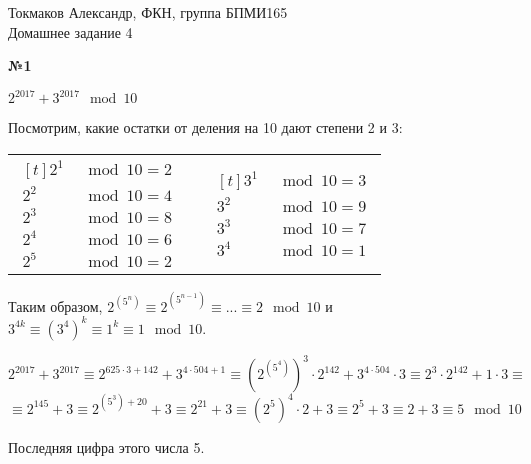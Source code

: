 \documentclass{article}
\newenvironment{task}{\begin{center}\fontsize{14}{14}\selectfont\bf}{\rm\fontsize{12}{12}\selectfont\end{center}}
\begin{document}
	\begin{center}
		Токмаков Александр, ФКН, группа БПМИ165 \\
		Домашнее задание 4
	\end{center}
	
	\begin{task} 
		№1
	\end{task}
	\begin{center}
		$2^{2017} + 3^{2017} \mod 10$\\
	\end{center}
	Посмотрим, какие остатки от деления на 10 дают степени 2 и 3: \\
	\begin{center}
	\begin{tabular}{ccc}
		$\begin{aligned}[t]
			2^1 & \mod 10 = 2 \\
			2^2 & \mod 10 = 4 \\
			2^3 & \mod 10 = 8 \\
			2^4 & \mod 10 = 6 \\
			2^5 & \mod 10 = 2 
		\end{aligned}$
		& \hspace{5cm} &
		$\begin{aligned}[t]
			3^1 & \mod 10 = 3 \\
			3^2 & \mod 10 = 9 \\
			3^3 & \mod 10 = 7 \\
			3^4 & \mod 10 = 1 
		\end{aligned}$
	\end{tabular}
	\end{center}
	Таким образом, $2^{(5^n)} \equiv 2^{(5^{n-1})}\equiv ... \equiv 2 \mod10$ и $3^{4k} \equiv \left(3^4\right)^k \equiv 1^k \equiv 1 \mod 10$.
	\begin{center}
		$2^{2017} + 3^{2017} \equiv 2^{625\cdot 3 + 142} + 3^{4\cdot504 + 1} \equiv \left(2^{(5^4)}\right)^3 \cdot 2^{142} + 3^{4\cdot 504}\cdot3 \equiv 2^3\cdot 2^{142} + 1\cdot 3 \equiv$ \\ 
		$\equiv 2^{145} + 3 \equiv 2^{(5^3) + 20} + 3 \equiv 2^{21} + 3 \equiv \left(2^{5}\right)^4 \cdot 2 + 3 \equiv 2^5 + 3 \equiv 2 + 3 \equiv 5 \mod10$
	\end{center}
	Последняя цифра этого числа 5.
	
\end{document}
